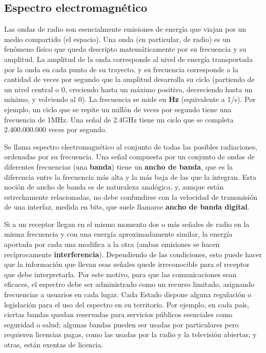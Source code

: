 \subsection {Espectro electromagnético}
Las ondas de radio son esencialmente emisiones de energía que viajan por un medio compartido (el espacio). Una onda (en particular, de radio) es un fenómeno físico que queda descripto matemáticamente por su frecuencia y su amplitud. La amplitud de la onda corresponde al nivel de energía transportada por la onda en cada punto de su trayecto, y su frecuencia corresponde a la cantidad de veces por segundo que la amplitud desarrolla su ciclo (partiendo de un nivel central o 0, creciendo hasta un máximo positivo, decreciendo hasta un mínimo, y volviendo al 0). La frecuencia se mide en \textbf{Hz} (equivalente a 1/s).  Por ejemplo, un ciclo que se repite un millón de veces por segundo tiene una frecuencia de 1MHz. Una señal de 2.4GHz tiene un ciclo que se completa 2.400.000.000 veces por segundo. 

Se llama espectro electromagnético al conjunto de todas las posibles radiaciones, ordenadas por su frecuencia. Una señal compuesta por un conjunto de ondas de diferentes frecuencias (una \textbf{banda}) tiene un \textbf{ancho de banda}, que es la diferencia entre la frecuencia más alta y la más baja de las que la integran. Esta noción de ancho de banda es de naturaleza analógica, y, aunque están estrechamente relacionadas, no debe confundirse con la velocidad de transmisión de una interfaz, medida en bits, que suele llamarse \textbf{ancho de banda digital}. 

Si a un receptor llegan en el mismo momento dos o más señales de radio en la misma frecuencia y con una energía aproximadamente similar, la energía aportada por cada una modifica a la otra (ambas emisiones se hacen recíprocamente \textbf{interferencia}). Dependiendo de las condiciones, esto puede hacer que la información que llevan esas señales quede irreconocible para el receptor que debe interpretarla. Por este motivo, para que las comunicaciones sean eficaces, el espectro debe ser administrado como un recurso limitado, asignando frecuencias a usuarios en cada lugar. Cada Estado dispone alguna regulación o legislación para el uso del espectro en su territorio. Por ejemplo, en cada país, ciertas bandas quedan reservadas para servicios públicos esenciales como seguridad o salud; algunas bandas pueden ser usadas por particulares pero requieren licencias pagas, como las usadas por la radio y la televisión abiertas; y otras, están exentas de licencia.  

